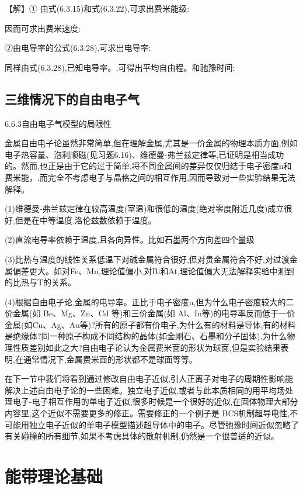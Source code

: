 【解】① 由式(6.3.15)和式(6.3.22),可求出费米能级:



因而可求出费米速度:



②由电导率的公式(6.3.28),可求出电导率:



同样由式(6.3.28),已知电导率。,可得出平均自由程。和驰豫时间:


\subsection{三维情况下的自由电子气}
6.6.3自由电子气模型的局限性

金属自由电子论虽然非常简单,但在理解金属,尤其是一价金属的物理本质方面,例如电子热容量、泡利顺磁(见习题6.16)、维德曼-弗兰兹定律等,已证明是相当成功的。然而,也正是由于它的过于简单,将不同金属间的差异仅仅归结于电子密度n和费米能，,而完全不考虑电子与晶格之间的相互作用,因而导致对一些实验结果无法解释。

(1)维德曼-弗兰兹定律在较高温度(室温)和很低的温度(绝对零度附近几度)成立很好,但是在中等温度,洛伦兹数依赖于温度。

(2)直流电导率依赖于温度,且各向异性。比如石墨两个方向差四个量级

(3)比热与温度的线性关系低温下对碱金属符合很好,但对贵金属符合不好,对过渡金属偏差更大。如对Fe、Mn,理论值偏小,对Bi和At,理论值偏大无法解释实验中测到的比热与T的关系。

(4)根据自由电子论,金属的电导率。正比于电子密度n,但为什么电子密度较大的二价金属(如 Be、Mg、Zn、Cd 等)和三价金属(如 Al、In等)的电导率反而低于一价金属(如Cu、Ag、Au等)?所有的原子都有价电子,为什么有的材料是导体,有的材料是绝缘体?同一种原子构成不同结构的晶体(如金刚石、石墨和分子固体),为什么物理性质差别如此之大?自由电子论认为金属费米面的形状为球面,但是实验结果表明,在通常情况下,金属费米面的形状都不是球面等等。

在下一节中我们将看到通过修改自由电子近似,引人正离子对电子的周期性影响能解决上述自由电子论的一些困难。独立电子近似,或者与此本质相同的用平均场处理电子-电子相互作用的单电子近似,很多时候是一个很好的近似,在固体物理大部分内容里,这个近似不需要更多的修正。需要修正的一个例子是 BCS机制超导电性,不可能用独立电子近似的单电子模型描述超导体中的电子。尽管弛豫时间近似忽略了有关碰撞的所有细节,如果不考虑具体的散射机制,仍然是一个很普适的近似。

\section{能带理论基础}

